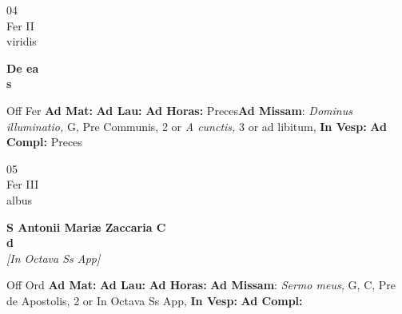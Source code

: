 \documentclass[10pt, openany]{book}
\begin{document}
        \begin{center}
            \begin{minipage}{3.5in}
                \vspace{2em}
                \begin{minipage}{0.5in}
                    {\Huge 04} \\
                    {\normalsize Fer II} \\
                    {\normalsize viridis}
                \end{minipage}
                \begin{minipage}{3.0in}
                    \textbf{ \large De ea \\
                    \textnormal{\normalsize s}} \\ 
                \end{minipage}
                \begin{justify}Off Fer
                    \textbf{Ad Mat: }
                    \textbf{Ad Lau: }
                    \textbf{Ad Horas: }Preces\textbf{Ad Missam}: \textit{Dominus illuminatio,} G, Pre Communis, 2 or \textit{A cunctis,} 3 or ad libitum,  
                    \textbf{In Vesp: }
                    \textbf{Ad Compl: }Preces
                \end{justify}
            \end{minipage}
        \end{center}
    
        \begin{center}
            \begin{minipage}{3.5in}
                \vspace{2em}
                \begin{minipage}{0.5in}
                    {\Huge 05} \\
                    {\normalsize Fer III} \\
                    {\normalsize albus}
                \end{minipage}
                \begin{minipage}{3.0in}
                    \textbf{ \large S Antonii Mariæ Zaccaria C \\
                    \textnormal{\normalsize d}} \\ \textit{[In Octava Ss App]} \\ 
                \end{minipage}
                \begin{justify}Off Ord
                    \textbf{Ad Mat: }
                    \textbf{Ad Lau: }
                    \textbf{Ad Horas: }\textbf{Ad Missam}: \textit{Sermo meus,} G, C, Pre de Apostolis, 2 or In Octava Ss App,  
                    \textbf{In Vesp: }
                    \textbf{Ad Compl: }
                \end{justify}
            \end{minipage}
        \end{center}
    
\end{document}
